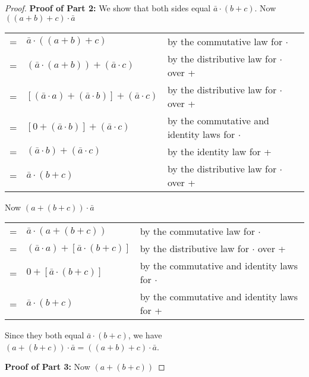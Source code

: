 \documentclass[14pt]{extarticle}
\newcommand{\cy}{\color{cyan}}
\begin{document}
\begin{proof}
    {\bf Proof of Part 2:} We show that both sides equal \(\bar{a} \cdot (b+c)\). Now \(((a + b) + c) \cdot \bar{a}\)

  \begin{center}
    \begin{tabular}{cll}
      = & \(\bar{a} \cdot ((a + b) + c)\)                                 & {\cy by the commutative law for $\cdot$}               \\
      = & \((\bar{a} \cdot (a + b)) + (\bar{a} \cdot c)\)                 & {\cy by the distributive law for $\cdot$ over +}       \\
      = & \([(\bar{a} \cdot a) + (\bar{a} \cdot b)] + (\bar{a} \cdot c)\) & {\cy by the distributive law for $\cdot$ over +}       \\
      = & \([0 + (\bar{a} \cdot b)] + (\bar{a} \cdot c)\)                 & {\cy by the commutative and identity laws for $\cdot$} \\
      = & \((\bar{a} \cdot b) + (\bar{a} \cdot c)\)                       & {\cy by the identity law for +}                        \\
      = & \(\bar{a} \cdot (b + c)\)                                       & {\cy by the distributive law for $\cdot$ over +}
    \end{tabular}
  \end{center}

  Now \((a + (b + c)) \cdot \bar{a}\)

  \begin{center}
    \begin{tabular}{cll}
      = & \(\bar{a} \cdot (a + (b+c))\)                   & {\cy by the commutative law for $\cdot$}               \\
      = & \((\bar{a} \cdot a) + [\bar{a} \cdot (b + c)]\) & {\cy by the distributive law for $\cdot$ over +}       \\
      = & \(0 + [\bar{a} \cdot (b + c)]\)                 & {\cy by the commutative and identity laws for $\cdot$} \\
      = & \(\bar{a} \cdot (b + c)\)                       & {\cy by the commutative and identity laws for +}
    \end{tabular}
  \end{center}

  Since they both equal \(\bar{a} \cdot (b + c)\), we have \((a + (b + c)) \cdot \bar{a} = ((a + b) + c) \cdot \bar{a}\).

    {\bf Proof of Part 3:} Now \((a + (b + c))\)


\end{proof}
\end{document}
